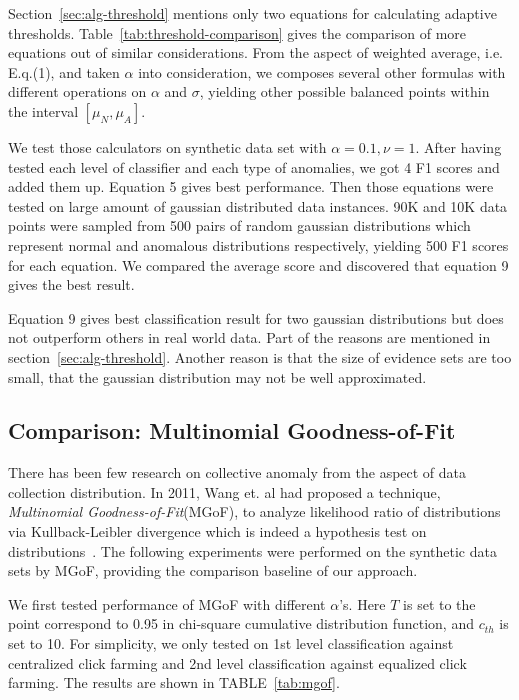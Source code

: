 \documentclass[10pt,conference,letterpaper]{IEEEtran}
\begin{document}
			Section~\ref{sec:alg-threshold} mentions only two equations for calculating adaptive thresholds. Table~\ref{tab:threshold-comparison} gives the comparison of more equations out of similar considerations. From the aspect of weighted average, i.e. E.q.(1), and taken $\alpha$ into consideration, we composes several other formulas with different operations on $\alpha$ and $\sigma$, yielding other possible balanced points within the interval $[\mu_N, \mu_A]$.
			
			We test those calculators on synthetic data set with $\alpha = 0.1, \nu = 1$. After having tested each level of classifier and each type of anomalies, we got 4 F1 scores and added them up. Equation 5 gives best performance. Then those equations were tested on large amount of gaussian distributed data instances. 90K and 10K data points were sampled from 500 pairs of random gaussian distributions which represent normal and anomalous distributions respectively, yielding 500 F1 scores for each equation. We compared the average score and discovered that equation 9 gives the best result.
	
			Equation 9 gives best classification result for two gaussian distributions but does not outperform others in real world data. Part of the reasons are mentioned in section~\ref{sec:alg-threshold}. Another reason is that the size of evidence sets are too small, that the gaussian distribution may not be well approximated.
	
		\subsection{Comparison: Multinomial Goodness-of-Fit}
			There has been few research on collective anomaly from the aspect of data collection distribution. In 2011, Wang et. al had proposed a technique, \textit{Multinomial Goodness-of-Fit}(MGoF), to analyze likelihood ratio of distributions via Kullback-Leibler divergence which is indeed a hypothesis test on distributions~\cite{wang2011statistical}. The following experiments were performed on the synthetic data sets by MGoF, providing the comparison baseline of our approach.
			
			We first tested performance of MGoF with different $\alpha$'s. Here $T$ is set to the point correspond to 0.95 in chi-square cumulative distribution function, and $c_{th}$ is set to 10. For simplicity, we only tested on 1st level classification against centralized click farming and 2nd level classification against equalized click farming. 
			The results are shown in TABLE~\ref{tab:mgof}.
			
\end{document}
